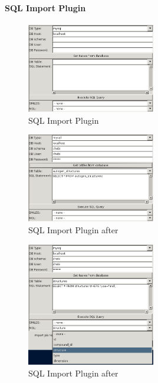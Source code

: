 \paragraph{SQL Import Plugin}
\begin{figure}[ht]
   \centering
   \includegraphics[width=0.5\textwidth]{images/import/sql_import_empty.png}
   \caption{SQL Import Plugin}
   \label{fig:sql_import_empty}
\end{figure}
\begin{figure}[ht]
   \centering
   \includegraphics[width=0.5\textwidth]{images/import/sql_import_get_tables.png}
   \caption{SQL Import Plugin after }
   \label{fig:sql_import_get_tables}
\end{figure}
\begin{figure}[ht]
   \centering
   \includegraphics[width=0.5\textwidth]{images/import/sql_import_execute.png}
   \caption{SQL Import Plugin after }
   \label{fig:sql_import_execute}
\end{figure}
